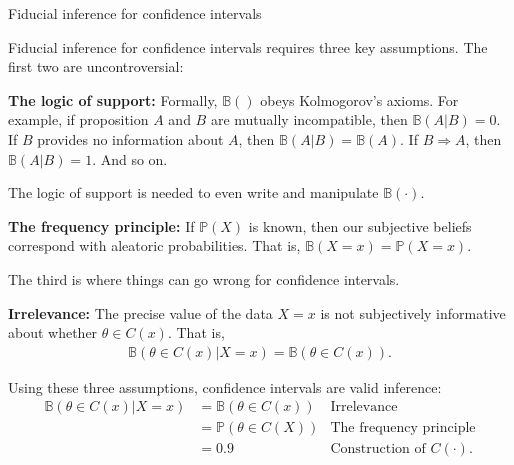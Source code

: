\documentclass[8pt]{beamer}\usepackage[]{graphicx}\usepackage[]{color}
\def\p#1{\mathbb{P}\left(#1\right)}
\def\b#1{\mathbb{B}\left(#1\right)}
\begin{document}
\begin{frame}{Fiducial inference for confidence intervals}

Fiducial inference for confidence intervals requires three key assumptions.
The first two are uncontroversial:

\textbf{The logic of support:}  Formally, $\b{}$ obeys Kolmogorov's axioms. For
example, if proposition $A$ and $B$ are mutually incompatible, then $\b{A | B} =
0$.  If $B$ provides no information about $A$, then $\b{A | B} = \b{A}$.
If $B \Rightarrow A$, then $\b{A | B} = 1$.  And so on.

The logic of support is needed to even write and manipulate $\b{\cdot}$.

\pause

\textbf{The frequency principle:}  If $\p{X}$ is known, then our
subjective beliefs correspond with aleatoric probabilities.  That is,
$\b{X = x} = \p{X = x}$.

\pause

The third is where things can go wrong for confidence intervals.

\textbf{Irrelevance:} The precise value of the data $X=x$ is not  subjectively
informative about whether $\theta \in C(x)$.  That is,
%
\begin{align*}
%
\b{\theta \in C(x) | X = x} = \b{\theta \in C(x)}.
%
\end{align*}
%

\pause

Using these three assumptions, confidence
intervals are valid inference:
%
\begin{align*}
%
\b{\theta \in C(x) | X = x} &= \b{\theta \in C(x)}
    & \textrm{Irrelevance}\\
&= \p{\theta \in C(X)}
    & \textrm{The frequency principle}\\
&= 0.9
& \textrm{Construction of }C(\cdot).
%
\end{align*}
%
\end{frame}



\end{document}
